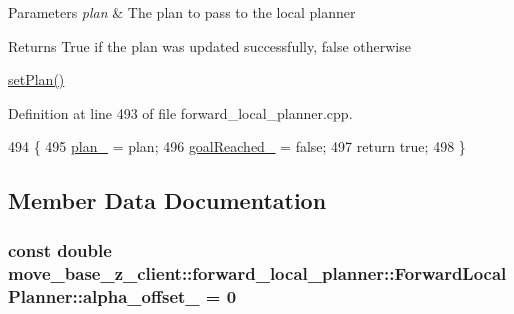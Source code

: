 \begin{DoxyParams}{Parameters}
{\em plan} & The plan to pass to the local planner \\
\hline
\end{DoxyParams}
\begin{DoxyReturn}{Returns}
True if the plan was updated successfully, false otherwise
\end{DoxyReturn}
\hyperlink{classmove__base__z__client_1_1forward__local__planner_1_1ForwardLocalPlanner_a525b842cadd1e69e944907e1945a61c8}{set\+Plan()} 

Definition at line 493 of file forward\+\_\+local\+\_\+planner.\+cpp.


\begin{DoxyCode}
494 \{
495     \hyperlink{classmove__base__z__client_1_1forward__local__planner_1_1ForwardLocalPlanner_a1c6191c999481e31fabd41f7a04041fe}{plan\_} = plan;
496     \hyperlink{classmove__base__z__client_1_1forward__local__planner_1_1ForwardLocalPlanner_a2c86f8381cc3b8677f95f32ae6939023}{goalReached\_} = \textcolor{keyword}{false};
497     \textcolor{keywordflow}{return} \textcolor{keyword}{true};
498 \}
\end{DoxyCode}


\subsection{Member Data Documentation}
\subsubsection[{\texorpdfstring{alpha\+\_\+offset\+\_\+}{alpha_offset_}}]{\setlength{\rightskip}{0pt plus 5cm}const double move\+\_\+base\+\_\+z\+\_\+client\+::forward\+\_\+local\+\_\+planner\+::\+Forward\+Local\+Planner\+::alpha\+\_\+offset\+\_\+ = 0\hspace{0.3cm}{\ttfamily [private]}}\hypertarget{classmove__base__z__client_1_1forward__local__planner_1_1ForwardLocalPlanner_a358adfdd02866b413518dee9d5212b8f}{}\label{classmove__base__z__client_1_1forward__local__planner_1_1ForwardLocalPlanner_a358adfdd02866b413518dee9d5212b8f}


